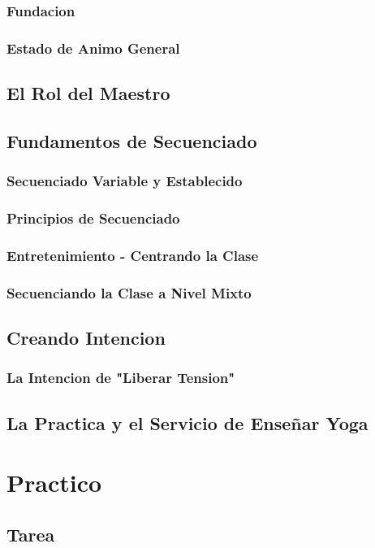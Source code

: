 \documentclass[a4paper]{article}
\begin{document}
\subsubsection{Fundacion}
\subsubsection{Estado de Animo General}
\subsection{El Rol del Maestro}
\subsection{Fundamentos de Secuenciado}
\subsubsection{Secuenciado Variable y Establecido}
\subsubsection{Principios de Secuenciado}
\subsubsection{Entretenimiento - Centrando la Clase}
\subsubsection{Secuenciando la Clase a Nivel Mixto}
\subsection{Creando Intencion}
\subsubsection{La Intencion de "Liberar Tension"}
\subsection{La Practica y el Servicio de Enseñar Yoga}

\section{Practico}
\subsection{Tarea}
\end{document}
